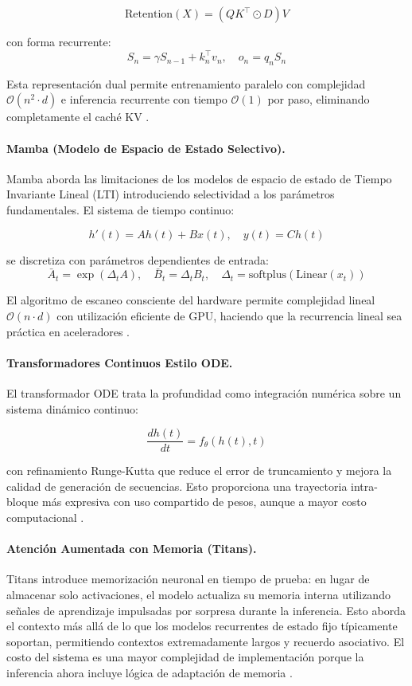 \documentclass[11pt,a4paper]{article}
\begin{document}
$$
\text{Retention}(X) = (QK^\top \odot D)V
$$

con forma recurrente:
$$
S_n = \gamma S_{n-1} + k_n^\top v_n,\quad o_n = q_n S_n
$$

Esta representación dual permite entrenamiento paralelo con complejidad $\mathcal{O}(n^2 \cdot d)$ e inferencia recurrente con tiempo $\mathcal{O}(1)$ por paso, eliminando completamente el caché KV \citep{sun_retentive_2023}.

\paragraph{Mamba (Modelo de Espacio de Estado Selectivo).}
Mamba aborda las limitaciones de los modelos de espacio de estado de Tiempo Invariante Lineal (LTI) introduciendo selectividad a los parámetros fundamentales. El sistema de tiempo continuo:

$$
h'(t) = A h(t) + B x(t),\quad y(t) = C h(t)
$$

se discretiza con parámetros dependientes de entrada:
$$
\bar{A}_t = \exp(\Delta_t A),\quad \bar{B}_t = \Delta_t B_t,\quad \Delta_t = \text{softplus}(\text{Linear}(x_t))
$$

El algoritmo de escaneo consciente del hardware permite complejidad lineal $\mathcal{O}(n \cdot d)$ con utilización eficiente de GPU, haciendo que la recurrencia lineal sea práctica en aceleradores \citep{gu_mamba_2023}.

\paragraph{Transformadores Continuos Estilo ODE.}
El transformador ODE trata la profundidad como integración numérica sobre un sistema dinámico continuo:

$$
\frac{dh(t)}{dt} = f_\theta(h(t),t)
$$

con refinamiento Runge-Kutta que reduce el error de truncamiento y mejora la calidad de generación de secuencias. Esto proporciona una trayectoria intra-bloque más expresiva con uso compartido de pesos, aunque a mayor costo computacional \citep{zhang_continuous_2021}.

\paragraph{Atención Aumentada con Memoria (Titans).}
Titans introduce memorización neuronal en tiempo de prueba: en lugar de almacenar solo activaciones, el modelo actualiza su memoria interna utilizando señales de aprendizaje impulsadas por sorpresa durante la inferencia. Esto aborda el contexto más allá de lo que los modelos recurrentes de estado fijo típicamente soportan, permitiendo contextos extremadamente largos y recuerdo asociativo. El costo del sistema es una mayor complejidad de implementación porque la inferencia ahora incluye lógica de adaptación de memoria \citep{behrouz_titans_2025}.
\end{document}
